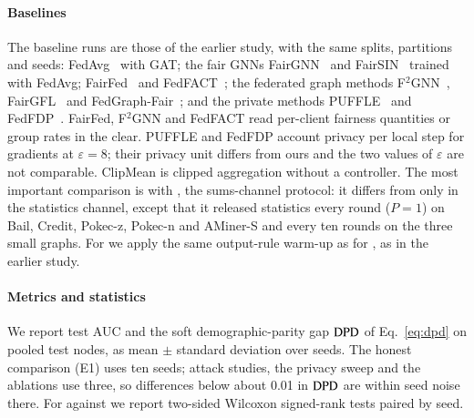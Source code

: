 \paragraph{Baselines}
The baseline runs are those of the earlier study, with the same splits, partitions and seeds: FedAvg~\citep{mcmahan2017communication} with GAT; the fair GNNs FairGNN~\citep{dai2021say} and FairSIN~\citep{yang2024fairsin} trained with FedAvg; FairFed~\citep{ezzeldin2023fairfed} and FedFACT~\citep{fedfact2025}; the federated graph methods F$^2$GNN~\citep{f2gnn2023}, FairGFL~\citep{fairgfl2026} and FedGraph-Fair~\citep{fedgraphfair2026}; and the private methods PUFFLE~\citep{corbucci2024puffle} and FedFDP~\citep{ling2024feddp}. FairFed, F$^2$GNN and FedFACT read per-client fairness quantities or group rates in the clear. PUFFLE and FedFDP account privacy per local step for gradients at $\varepsilon=8$; their privacy unit differs from ours and the two values of $\varepsilon$ are not comparable. ClipMean is clipped aggregation without a controller. The most important comparison is with \clamp{}, the sums-channel protocol: it differs from \rt{} only in the statistics channel, except that it released statistics every round ($P=1$) on Bail, Credit, Pokec-z, Pokec-n and AMiner-S and every ten rounds on the three small graphs. For \clamp{} we apply the same output-rule warm-up as for \rt{}, as in the earlier study.

\paragraph{Metrics and statistics}
We report test AUC and the soft demographic-parity gap $\mathrm{DPD}$ of Eq.~\eqref{eq:dpd} on pooled test nodes, as mean $\pm$ standard deviation over seeds. The honest comparison (E1) uses ten seeds; attack studies, the privacy sweep and the ablations use three, so differences below about 0.01 in $\mathrm{DPD}$ are within seed noise there. For \rt{} against \clamp{} we report two-sided Wilcoxon signed-rank tests paired by seed.

